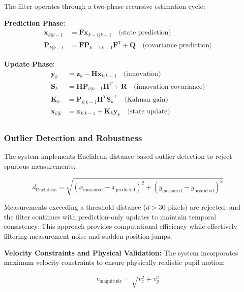 \documentclass[conference]{IEEEtran}
\begin{document}
The filter operates through a two-phase recursive estimation cycle\cite{julier2004unscented}:

\textbf{Prediction Phase:}
\begin{align}
\mathbf{x}_{k|k-1} &= \mathbf{F} \mathbf{x}_{k-1|k-1} \quad \text{(state prediction)} \\
\mathbf{P}_{k|k-1} &= \mathbf{F} \mathbf{P}_{k-1|k-1} \mathbf{F}^T + \mathbf{Q} \quad \text{(covariance prediction)}
\end{align}

\textbf{Update Phase:}
\begin{align}
\mathbf{y}_k &= \mathbf{z}_k - \mathbf{H} \mathbf{x}_{k|k-1} \quad \text{(innovation)} \\
\mathbf{S}_k &= \mathbf{H} \mathbf{P}_{k|k-1} \mathbf{H}^T + \mathbf{R} \quad \text{(innovation covariance)} \\
\mathbf{K}_k &= \mathbf{P}_{k|k-1} \mathbf{H}^T \mathbf{S}_k^{-1} \quad \text{(Kalman gain)} \\
\mathbf{x}_{k|k} &= \mathbf{x}_{k|k-1} + \mathbf{K}_k \mathbf{y}_k \quad \text{(state update)} \\
\end{align}

\subsubsection{Outlier Detection and Robustness}

The system implements Euclidean distance-based outlier detection to reject spurious measurements:

\begin{equation}
d_{\text{Euclidean}} = \sqrt{(x_{\text{measured}} - x_{\text{predicted}})^2 + (y_{\text{measured}} - y_{\text{predicted}})^2}
\end{equation}

Measurements exceeding a threshold distance ($d > 30$ pixels) are rejected, and the filter continues with prediction-only updates to maintain temporal consistency. This approach provides computational efficiency while effectively filtering measurement noise and sudden position jumps.

\textbf{Velocity Constraints and Physical Validation:} The system incorporates maximum velocity constraints to ensure physically realistic pupil motion:

\begin{equation}
v_{\text{magnitude}} = \sqrt{v_x^2 + v_y^2}
\end{equation}
\end{document}
